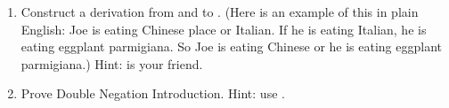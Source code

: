 \begin{enumerate}
{{}}


 \newpage

\item Construct a derivation from  and  
 to . (Here is an example of this in plain English: Joe 
 is eating Chinese place or Italian. If he is eating Italian, he is eating 
 eggplant parmigiana. So Joe is eating Chinese or he is eating eggplant 
 parmigiana.) Hint: \disjE{} is your friend.
\opts{
 \dotline

 \dotline

 \dotline

 \dotline

 \dotline

 \dotline

 \dotline

 \dotline

 \dotline

 \dotline

 \dotline

 \dotline

 \dotline

 \dotline

 \dotline

 \dotline

 \dotline

 \dotline

 \dotline
}
{
}

 \newpage
\item Prove Double Negation Introduction. Hint: use \negI{}.
\opts{
 \dotline

 \dotline

 \dotline

 \dotline

}
\end{enumerate}
